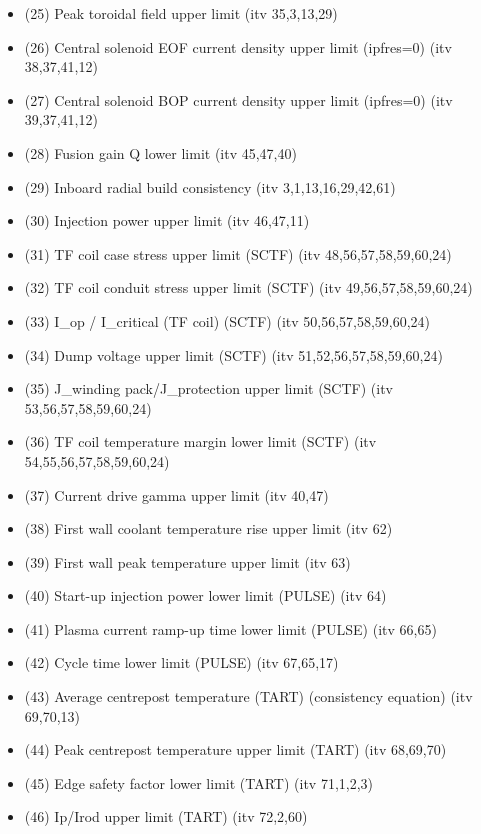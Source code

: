 \documentclass[]{article}
\begin{document}
\begin{itemize}
\begin{itemize}
    (24) Beta upper limit (itv 36,1,2,3,4,6,18)
  \item
    (25) Peak toroidal field upper limit (itv 35,3,13,29)
  \item
    (26) Central solenoid EOF current density upper limit (ipfres=0)
    (itv 38,37,41,12)
  \item
    (27) Central solenoid BOP current density upper limit (ipfres=0)
    (itv 39,37,41,12)
  \item
    (28) Fusion gain Q lower limit (itv 45,47,40)
  \item
    (29) Inboard radial build consistency (itv 3,1,13,16,29,42,61)
  \item
    (30) Injection power upper limit (itv 46,47,11)
  \item
    (31) TF coil case stress upper limit (SCTF) (itv
    48,56,57,58,59,60,24)
  \item
    (32) TF coil conduit stress upper limit (SCTF) (itv
    49,56,57,58,59,60,24)
  \item
    (33) I\_op / I\_critical (TF coil) (SCTF) (itv 50,56,57,58,59,60,24)
  \item
    (34) Dump voltage upper limit (SCTF) (itv 51,52,56,57,58,59,60,24)
  \item
    (35) J\_winding pack/J\_protection upper limit (SCTF) (itv
    53,56,57,58,59,60,24)
  \item
    (36) TF coil temperature margin lower limit (SCTF) (itv
    54,55,56,57,58,59,60,24)
  \item
    (37) Current drive gamma upper limit (itv 40,47)
  \item
    (38) First wall coolant temperature rise upper limit (itv 62)
  \item
    (39) First wall peak temperature upper limit (itv 63)
  \item
    (40) Start-up injection power lower limit (PULSE) (itv 64)
  \item
    (41) Plasma current ramp-up time lower limit (PULSE) (itv 66,65)
  \item
    (42) Cycle time lower limit (PULSE) (itv 67,65,17)
  \item
    (43) Average centrepost temperature (TART) (consistency equation)
    (itv 69,70,13)
  \item
    (44) Peak centrepost temperature upper limit (TART) (itv 68,69,70)
  \item
    (45) Edge safety factor lower limit (TART) (itv 71,1,2,3)
  \item
    (46) Ip/Irod upper limit (TART) (itv 72,2,60)

\end{itemize}
\end{itemize}
\end{document}
